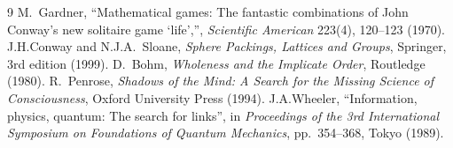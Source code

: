 \documentclass{article}
\begin{document}
\begin{thebibliography}{9}
M.~Gardner,
\newblock ``Mathematical games: The fantastic combinations of John Conway's new solitaire game `life','',
\newblock \emph{Scientific American} 223(4), 120--123 (1970).
J.H.Conway and N.J.A.~Sloane,
\newblock \emph{Sphere Packings, Lattices and Groups},
\newblock Springer, 3rd edition (1999).
D.~Bohm,
\newblock \emph{Wholeness and the Implicate Order},
\newblock Routledge (1980).
R.~Penrose,
\newblock \emph{Shadows of the Mind: A Search for the Missing Science of Consciousness},
\newblock Oxford University Press (1994).
J.A.Wheeler,
\newblock ``Information, physics, quantum: The search for links'',
\newblock in \emph{Proceedings of the 3rd International Symposium on Foundations of Quantum Mechanics},
\newblock pp.~354--368, Tokyo (1989).



\end{thebibliography}
\end{document}
